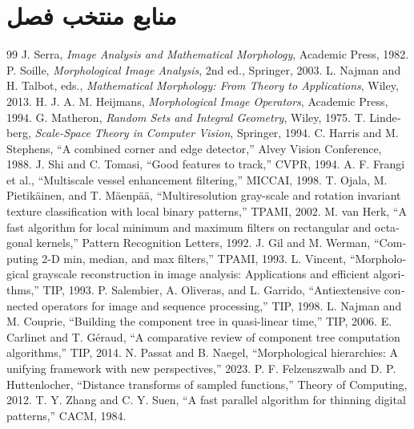 \documentclass[12pt,openany,oneside]{book}
\begin{document}
\chapter*{منابع منتخب فصل}
\begin{latin}
\begin{thebibliography}{99}
 J. Serra, \textit{Image Analysis and Mathematical Morphology}, Academic Press, 1982.
 P. Soille, \textit{Morphological Image Analysis}, 2nd ed., Springer, 2003.
 L. Najman and H. Talbot, eds., \textit{Mathematical Morphology: From Theory to Applications}, Wiley, 2013.
 H. J. A. M. Heijmans, \textit{Morphological Image Operators}, Academic Press, 1994.
 G. Matheron, \textit{Random Sets and Integral Geometry}, Wiley, 1975.
 T. Lindeberg, \textit{Scale-Space Theory in Computer Vision}, Springer, 1994.
 C. Harris and M. Stephens, ``A combined corner and edge detector,'' Alvey Vision Conference, 1988.
 J. Shi and C. Tomasi, ``Good features to track,'' CVPR, 1994.
 A. F. Frangi et al., ``Multiscale vessel enhancement filtering,'' MICCAI, 1998.
 T. Ojala, M. Pietikäinen, and T. Mäenpää, ``Multiresolution gray-scale and rotation invariant texture classification with local binary patterns,'' TPAMI, 2002.
 M. van Herk, ``A fast algorithm for local minimum and maximum filters on rectangular and octagonal kernels,'' Pattern Recognition Letters, 1992.
 J. Gil and M. Werman, ``Computing 2-D min, median, and max filters,'' TPAMI, 1993.
 L. Vincent, ``Morphological grayscale reconstruction in image analysis: Applications and efficient algorithms,'' TIP, 1993.
 P. Salembier, A. Oliveras, and L. Garrido, ``Antiextensive connected operators for image and sequence processing,'' TIP, 1998.
 L. Najman and M. Couprie, ``Building the component tree in quasi-linear time,'' TIP, 2006.
 E. Carlinet and T. Géraud, ``A comparative review of component tree computation algorithms,'' TIP, 2014.
 N. Passat and B. Naegel, ``Morphological hierarchies: A unifying framework with new perspectives,'' 2023.
 P. F. Felzenszwalb and D. P. Huttenlocher, ``Distance transforms of sampled functions,'' Theory of Computing, 2012.
 T. Y. Zhang and C. Y. Suen, ``A fast parallel algorithm for thinning digital patterns,'' CACM, 1984.

\end{thebibliography}
\end{latin}
\end{document}
